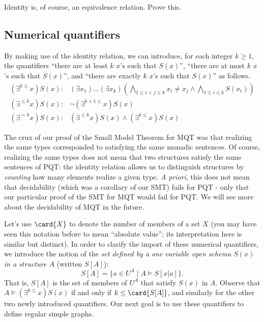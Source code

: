 \begin{aside}
    Identity is, of course, an equivalence relation. Prove this. 
\end{aside}

\subsection*{Numerical quantifiers}
By making use of the identity relation, we can introduce, for each integer $k\geq 1$, the quantifiers ``there are at least $k$ $x$'s such that $S(x)$'', ``there are at most $k$ $x$'s such that $S(x)$'', and ``there are exactly  $k$ $x$'s such that $S(x)$'' as follows.
\[
\begin{array}{ll}
(\exists^{k\leq}x)S(x):  & (\exists x_1)\ldots(\exists x_k)(\bigwedge_{1\leq i<j\leq k}x_i\neq x_j\wedge \bigwedge_{1\leq i\leq k}S(x_i))\\
(\exists^{\leq k}x)S(x): & \neg (\exists^{k+1\leq}x)S(x)\\
(\exists^{ = k}x)S(x): & (\exists^{\leq k}x)S(x)\wedge(\exists^{k\leq}x)S(x)
\end{array}
\]

\begin{aside}
    The crux of our proof of the Small Model Theorem for MQT was that realizing the same types corresponded to satisfying the same monadic sentences. Of course, realizing the same types does not mean that two structures satisfy the same sentences of PQT: the identity relation allows us to distinguish structures by \emph{counting} how many elements realize a given type. \emph{A priori}, this does not mean that decidability (which was a corollary of our SMT) fails for PQT - only that our particular proof of the SMT for MQT would fail for PQT. We will see more about the decidability of MQT in the future. 
\end{aside}

Let's use $\card{X}$ to denote the number of members of a set $X$ (you may have seen this notation before to mean ``absolute value''; its interpretation here is similar but distinct).    
In order to clarify the import of these  numerical quantifiers, we introduce the notion of the \emph{set defined by a one variable open schema $S(x)$ in a structure $A$} (written $S[A]$):
\[S[A]=\{a\in U^A\mid A\models S[x|a]\}.\] That is, $S[A]$ is the set of members of $U^A$ that satisfy $S(x)$ in $A$. Observe that $A\models(\exists^{k\leq}x)S(x)$ if and only if $k\leq\card{S[A]}$, and similarly for the other two newly introduced quantifiers. Our next goal is to use these quantifiers to define regular simple graphs.